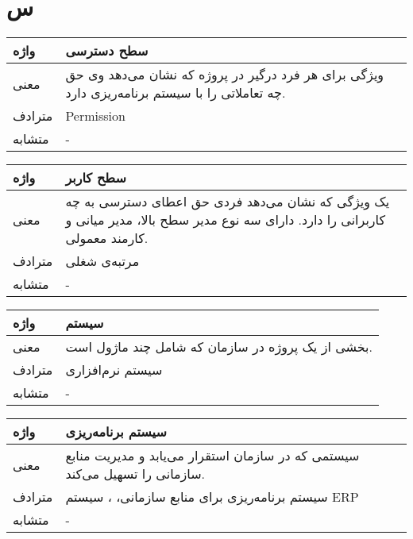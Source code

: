 \section*{س}%
\begin{table}[H]
	\centering
	\begin{tabular}{| p{1.5cm} | p{5cm} |}
		\hline
		واژه & سطح دسترسی \\
		\hline
		معنی  & ویژگی برای هر فرد درگیر در پروژه که نشان می‌دهد وی حق چه تعاملاتی را با سیستم برنامه‌ریزی دارد.  \\
		\hline
		مترادف & Permission \\
		\hline
		متشابه  & - \\
		\hline
	\end{tabular}
\end{table}

\begin{table}[H]
	\centering
	\begin{tabular}{| p{1.5cm} | p{5cm} |}
		\hline
		واژه & سطح کاربر \\
		\hline
		معنی  & یک ویژگی که نشان می‌دهد فردی حق اعطای دسترسی به چه کاربرانی را دارد. دارای سه نوع مدیر سطح بالا، مدیر میانی و کارمند معمولی. \\
		\hline
		مترادف & مرتبه‌ی شغلی \\
		\hline
		متشابه  & - \\
		\hline
	\end{tabular}
\end{table}

\begin{table}[H]
	\centering
	\begin{tabular}{| p{1.5cm} | p{5cm} |}
		\hline
		واژه & سیستم \\
		\hline
		معنی  &  بخشی از یک پروژه در سازمان که شامل چند ماژول است. \\
		\hline
		مترادف &  سیستم نرم‌افزاری \\
		\hline
		متشابه  & - \\
		\hline
	\end{tabular}
\end{table}

\begin{table}[H]
	\centering
	\begin{tabular}{| p{1.5cm} | p{5cm} |}
		\hline
		واژه & سیستم برنامه‌ریزی \\
		\hline
		معنی  & سیستمی که در سازمان استقرار می‌یابد و مدیریت منابع سازمانی را تسهیل می‌کند.  \\
		\hline
		مترادف & سیستم برنامه‌ریزی برای منابع سازمانی،
	 {\small \lr{Enterprise Resource Planning System}}، سیستم ERP \\
		\hline
		متشابه  & - \\
		\hline
	\end{tabular}
\end{table}

